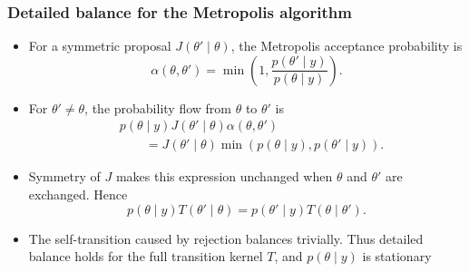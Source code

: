 \documentclass[10pt]{beamer}
\begin{document}
\begin{frame}

\frametitle{Detailed balance for the Metropolis algorithm}

  \begin{itemize}
  \item For a symmetric proposal $J(\theta'\mid\theta)$, the Metropolis
    acceptance probability is
    \[
      \alpha(\theta,\theta')=
      \min\!\left(1,\frac{p(\theta'\mid y)}{p(\theta\mid y)}\right).
    \]
  \pause
  \item For $\theta'\neq\theta$, the probability flow from $\theta$ to
    $\theta'$ is
    \begin{align*}
      &p(\theta\mid y)J(\theta'\mid\theta)\alpha(\theta,\theta')\\
      &\qquad=J(\theta'\mid\theta)
        \min\!\left(p(\theta\mid y),p(\theta'\mid y)\right).
    \end{align*}
  \pause
  \item Symmetry of $J$ makes this expression unchanged when
    $\theta$ and $\theta'$ are exchanged. Hence
    \[
      p(\theta\mid y)T(\theta'\mid\theta)
      =p(\theta'\mid y)T(\theta\mid\theta').
    \]
  \item<4-> The self-transition caused by rejection balances trivially.
    Thus detailed balance holds for the full transition kernel $T$, and
    $p(\theta\mid y)$ is stationary
  \end{itemize}




\end{frame}
\end{document}
